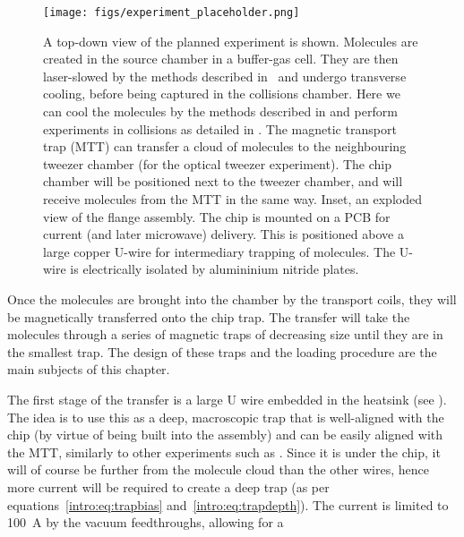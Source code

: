 \begin{figure}[htb]
  \centering
  \texttt{[image: figs/experiment\_placeholder.png]}
  \caption{
    A top-down view of the planned \CaF{} experiment is shown. Molecules are
    created in the source chamber in a buffer-gas cell. They are then
    laser-slowed by the methods described in~\cite{} and undergo transverse
    cooling, before being captured in the collisions chamber.
    Here we can cool the
    molecules by the methods described in  and perform
    experiments in collisions as detailed in . The magnetic transport
    trap (MTT) can transfer a cloud of molecules to the neighbouring tweezer
    chamber (for the optical tweezer experiment). The chip chamber will be
    positioned next to the tweezer chamber, and will receive molecules from the
    MTT in the same way. Inset, an exploded view of the flange assembly. The
    chip is mounted on a PCB for current (and later microwave) delivery. This
    is positioned above a large copper U-wire for intermediary trapping of
    molecules. The U-wire is electrically isolated by alumininium nitride
    plates.}
  \label{design:fig:vacuumsystem}
\end{figure}


Once the molecules are brought into the chamber by the transport coils, they
will be magnetically transferred onto the chip trap. The transfer will take
the molecules through a series of magnetic traps of decreasing size until
they are in the smallest trap. The design of these traps and the loading
procedure are the main subjects of this chapter.

The first stage of the transfer is a large U wire embedded in the heatsink (see
).  The idea is to use this as a deep,
macroscopic trap that is well-aligned with the chip (by virtue of being built
into the assembly) and can be easily aligned with the MTT, similarly to other
experiments such as .  Since it is under the chip, it will
of course be further from the molecule cloud than the other wires, hence more
current will be required to create a deep trap (as per
equations~\ref{intro:eq:trapbias} and~\ref{intro:eq:trapdepth}). The current is
limited to \SI{100}{\ampere} by the vacuum feedthroughs, allowing for a

